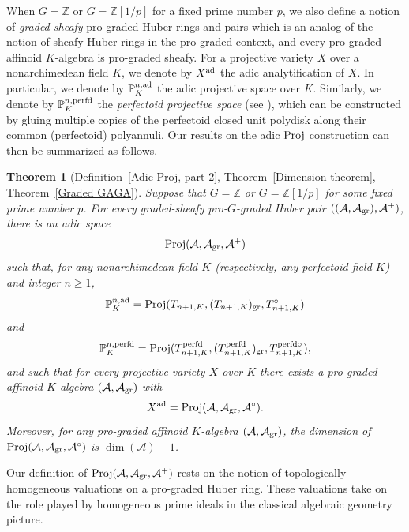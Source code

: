 \documentclass[12pt,twoside,a4paper]{article}
\newtheorem{thm}{Theorem}[section]
\theoremstyle{definition}
\theoremstyle{remark}
\newcommand\ad{{\rm ad}}
\newcommand\gr{{\rm gr}}
\newcommand\perfd{{\rm perfd}}
\newcommand\Proj{{\rm Proj}}
\begin{document}
When $G=\mathbb{Z}$ or $G=\mathbb{Z}[1/p]$ for a fixed prime number $p$, we also define a notion of \textit{graded-sheafy} pro-graded Huber rings and pairs which is an analog of the notion of sheafy Huber rings in the pro-graded context, and every pro-graded affinoid $K$-algebra is pro-graded sheafy. For a projective variety $X$ over a nonarchimedean field $K$, we denote by $X^{\ad}$ the adic analytification of $X$. In particular, we denote by $\mathbb{P}_{K}^{n,\ad}$ the adic projective space over $K$. Similarly, we denote by $\mathbb{P}_{K}^{n,\perfd}$ the \textit{perfectoid projective space} (see \cite{Scholze}), which can be constructed by gluing multiple copies of the perfectoid closed unit polydisk along their common (perfectoid) polyannuli. Our results on the adic $\Proj$ construction can then be summarized as follows.  
\begin{thm}[Definition~\ref{Adic Proj, part 2}, Theorem~\ref{Dimension theorem}, Theorem~\ref{Graded GAGA}]\label{Main theorem}Suppose that $G=\mathbb{Z}$ or $G=\mathbb{Z}[1/p]$ for some fixed prime number $p$. For every graded-sheafy pro-$G$-graded Huber pair $((\mathcal{A}, \mathcal{A}_{\gr}), \mathcal{A}^{+})$, there is an adic space \begin{equation*}\Proj(\mathcal{A}, \mathcal{A}_{\gr}, \mathcal{A}^{+})\end{equation*}such that, for any nonarchimedean field $K$ (respectively, any perfectoid field $K$) and integer $n\geq1$, \begin{equation*}\mathbb{P}_{K}^{n,\ad}=\Proj(T_{n+1, K}, (T_{n+1, K})_{\gr}, T_{n+1, K}^{\circ})\end{equation*}and \begin{equation*}\mathbb{P}_{K}^{n,\perfd}=\Proj(T_{n+1, K}^{\perfd}, (T_{n+1, K}^{\perfd})_{\gr}, T_{n+1, K}^{\perfd\circ}),\end{equation*}and such that for every projective variety $X$ over $K$ there exists a pro-graded affinoid $K$-algebra $(\mathcal{A}, \mathcal{A}_{\gr})$ with \begin{equation*}X^{\ad}=\Proj(\mathcal{A}, \mathcal{A}_{\gr}, \mathcal{A}^{\circ}).\end{equation*}Moreover, for any pro-graded affinoid $K$-algebra $(\mathcal{A}, \mathcal{A}_{\gr})$, the dimension of $\Proj(\mathcal{A}, \mathcal{A}_{\gr}, \mathcal{A}^{\circ})$ is $\dim(\mathcal{A})-1$. \end{thm}
Our definition of $\Proj(\mathcal{A}, \mathcal{A}_{\gr}, \mathcal{A}^{+})$ rests on the notion of topologically homogeneous valuations on a pro-graded Huber ring. These valuations take on the role played by homogeneous prime ideals in the classical algebraic geometry picture. 
\end{document}
